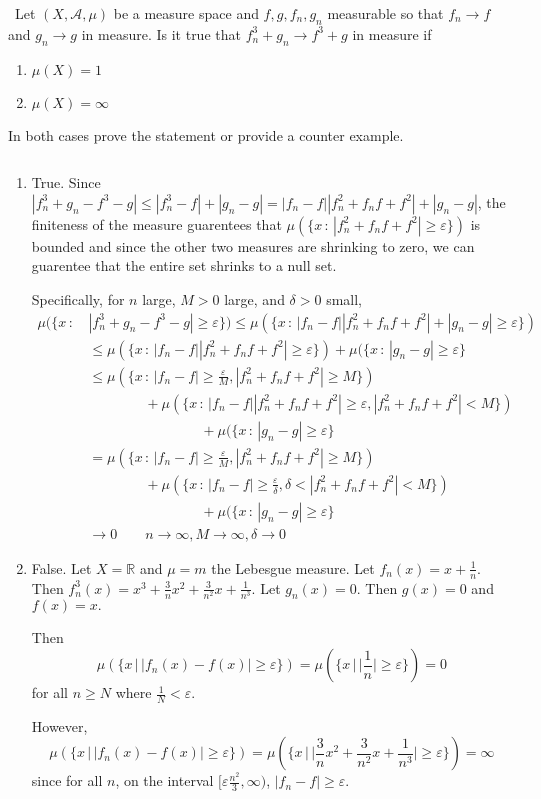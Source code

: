 \documentclass[12pt]{Homework}
\begin{document}
\begin{problem} $\,$
Let $(X,\mathscr{A},\mu)$ be a measure space and $f,g,f_n,g_n$ measurable so that $f_n\to f$ and $g_n\to g$ in measure. Is it true that $f_n^3+g_n\to f^3+g$ in measure if \begin{enumerate}[label=(\alph*)]
    \item $\mu(X)=1$
    \item $\mu(X)=\infty$
\end{enumerate}
In both cases prove the statement or provide a counter example.
\end{problem}


\begin{solution}$\,$
\begin{enumerate}[label=(\alph*)]
    \item True. Since $|f_n^3+g_n-f^3-g|\le |f_n^3-f|+|g_n-g|=|f_n-f||f_n^2+f_nf+f^2|+|g_n-g|$, the finiteness of the measure guarentees that $\mu(\{x\,:\,|f_n^2+f_nf+f^2|\ge\varepsilon\})$ is bounded and since the other two measures are shrinking to zero, we can guarentee that the entire set shrinks to a null set.
    
    Specifically, for $n$ large, $M>0$ large, and $\delta>0$ small, \begin{align*}
        \mu(\{x\,:\,&|f_n^3+g_n-f^3-g|\ge\varepsilon\})\le\mu(\{x\,:\,|f_n-f||f_n^2+f_nf+f^2|+|g_n-g|\ge\varepsilon\})\\
        &\le \mu(\{x\,:\,|f_n-f||f_n^2+f_nf+f^2|\ge\varepsilon\})+\mu(\{x\,:\,|g_n-g|\ge\varepsilon\}\\
        &\le \mu(\{x\,:\,|f_n-f|\ge\frac{\varepsilon}{M}, |f_n^2+f_nf+f^2|\ge M\})\\
        &\qquad\qquad+\mu(\{x\,:\,|f_n-f||f_n^2+f_nf+f^2|\ge\varepsilon,|f_n^2+f_nf+f^2|<M\})\\
        &\qquad\qquad\qquad\qquad+\mu(\{x\,:\,|g_n-g|\ge\varepsilon\}\\
        &=\mu(\{x\,:\,|f_n-f|\ge\frac{\varepsilon}{M},|f_n^2+f_nf+f^2|\ge M\})\\
        &\qquad\qquad+\mu(\{x\,:\,|f_n-f|\ge\frac{\varepsilon}{\delta},\delta<|f_n^2+f_nf+f^2|<M\})\\
        &\qquad\qquad\qquad\qquad+\mu(\{x\,:\,|g_n-g|\ge\varepsilon\}\\
        &\to 0\qquad n\to\infty, M\to\infty,\delta\to0
    \end{align*}
    \item False. Let $X=\mathbb{R}$ and $\mu=m$ the Lebesgue measure. Let $f_n(x)=x+\frac{1}{n}$. Then $f_n^3(x)=x^3+\frac{3}{n}x^2+\frac{3}{n^2}x+\frac{1}{n^3}$. Let $g_n(x)=0$. Then $g(x)=0$ and $f(x)=x.$
    
    Then $$\mu(\{x\,|\,|f_n(x)-f(x)|\ge\varepsilon\})=\mu(\{x\,|\,|\frac{1}{n}|\ge\varepsilon\})=0$$ for all $n\ge N$ where $\frac{1}{N}<\varepsilon$.
    
    However, $$\mu(\{x\,|\,|f_n(x)-f(x)|\ge\varepsilon\})=\mu(\{x\,|\,|\frac{3}{n}x^2+\frac{3}{n^2}x+\frac{1}{n^3}|\ge\varepsilon\})=\infty$$ since for all $n$, on the interval $[\varepsilon \frac{n^2}{3},\infty)$, $|f_n-f|\ge\varepsilon$.
\end{enumerate}
\end{solution}
\end{document}
